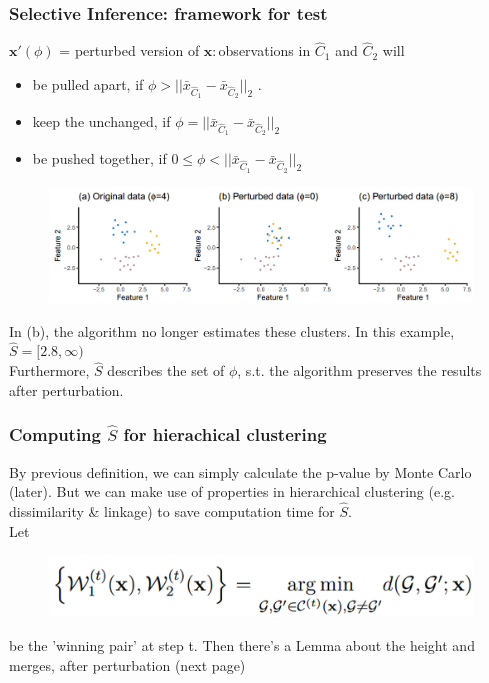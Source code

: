 \documentclass{beamer}
\begin{document}
	\begin{frame}
		\frametitle{Selective Inference: framework for test}
		$\bm{x}'(\phi)$ = perturbed version of $\bm{x}: $observations in $\hat{C}_1 $ and $\hat{C}_2$ will
		\begin{itemize}
			\item
			be pulled apart, if $\phi > ||\bar{x}_{\hat{C}_1} - \bar{x}_{\hat{C}_2}||_2$ .
			\item
			keep the unchanged, if $\phi = ||\bar{x}_{\hat{C}_1} - \bar{x}_{\hat{C}_2}||_2$
			\item
			be pushed together, if $0 \leq \phi < ||\bar{x}_{\hat{C}_1} - \bar{x}_{\hat{C}_2}||_2$
		\end{itemize}
		\begin{figure}
			\includegraphics[width=1\linewidth]{image011.png}
		\end{figure}
	In (b), the algorithm no longer estimates these clusters. In this example, $\hat{S} = [2.8, \infty)$\\
	Furthermore, $\hat{S}$ describes the set of $\phi$, s.t. the algorithm preserves the results after perturbation.
	\end{frame}
	
	\begin{frame}
		\frametitle{Computing $\hat{S}$ for hierachical clustering}
		By previous definition, we can simply calculate the p-value by Monte Carlo (later). But we can make use of properties in hierarchical clustering (e.g. dissimilarity \& linkage) to save computation time for $\hat{S}$.\\
		Let
		\begin{figure}
			\includegraphics[width=.5\linewidth]{image012.png}
		\end{figure}
		be the 'winning pair' at step t. Then there's a Lemma about the height and merges, after perturbation (next page)
		
	\end{frame}
	
\end{document}

